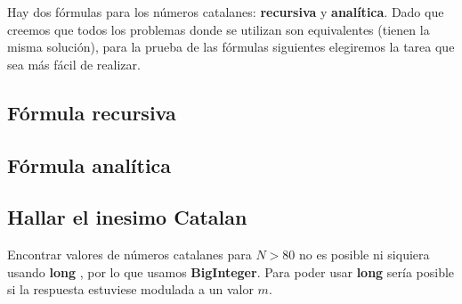 Hay dos fórmulas para los números catalanes: \textbf{recursiva} y \textbf{analítica}. Dado que creemos que todos los problemas donde se utilizan son equivalentes (tienen la misma solución), para la prueba de las fórmulas siguientes elegiremos la tarea que sea más fácil de realizar.

\subsection{Fórmula recursiva}


\subsection{Fórmula analítica}


\subsection{Hallar el inesimo Catalan}


Encontrar valores de números catalanes para $N>80$ no es posible ni siquiera usando \textbf{long} , por lo que usamos \textbf{BigInteger}. Para poder usar \textbf{long} sería posible si la respuesta estuviese modulada a un valor $m$.

